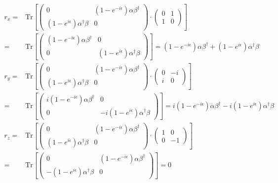\begin{equation}
  \begin{split}
    r_{x} = &  \text{Tr} \left[ \begin{pmatrix}
 0 & (1-e^{-i\epsilon})\alpha \beta^{\dag} \\
 (1-e^{i\epsilon})\alpha^{\dag} \beta  & 0
  \end{pmatrix} \cdot \begin{pmatrix}
  0&1\\
  1&0
  \end{pmatrix} \right]  \\
  = & \text{Tr} \left[ \begin{pmatrix}
    (1-e^{-i\epsilon})\alpha \beta^{\dag}  & 0\\
  0 &  (1-e^{i\epsilon})\alpha^{\dag} \beta
  \end{pmatrix} \right] = (1-e^{-i\epsilon})\alpha \beta^{\dag}  + (1-e^{i\epsilon})\alpha^{\dag} \beta \\
  r_{y} = &  \text{Tr} \left[ \begin{pmatrix}
  0 & (1-e^{-i\epsilon})\alpha \beta^{\dag} \\
  (1-e^{i\epsilon})\alpha^{\dag} \beta  & 0
  \end{pmatrix} \cdot \begin{pmatrix}
  0&-i\\
  i&0
  \end{pmatrix} \right]  \\
  = & \text{Tr} \left[ \begin{pmatrix}
    i(1-e^{-i\epsilon})\alpha \beta^{\dag}  & 0\\
  0 &  -i(1-e^{i\epsilon})\alpha^{\dag} \beta
  \end{pmatrix} \right] = i(1-e^{-i\epsilon})\alpha \beta^{\dag}  - i(1-e^{i\epsilon})\alpha^{\dag} \beta \\
  r_{z} = &  \text{Tr} \left[ \begin{pmatrix}
  0 & (1-e^{-i\epsilon})\alpha \beta^{\dag} \\
  (1-e^{i\epsilon})\alpha^{\dag} \beta  & 0
  \end{pmatrix} \cdot \begin{pmatrix}
  1&0\\
  0&-1
  \end{pmatrix} \right]  \\
  = & \text{Tr} \left[ \begin{pmatrix}
    0&(1-e^{-i\epsilon})\alpha \beta^{\dag} \\
    -(1-e^{i\epsilon})\alpha^{\dag} \beta  & 0
  \end{pmatrix} \right] = 0 \\
  \end{split}
  \end{equation}

